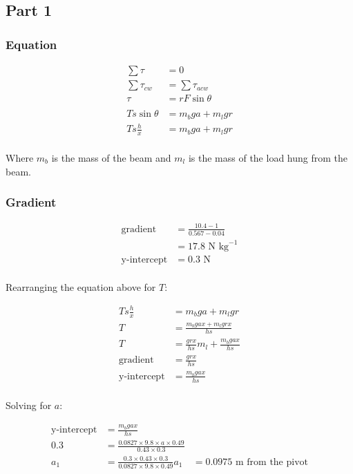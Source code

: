 \documentclass[a4paper,11pt]{article}
\begin{document}
\subsection{Part 1}

\subsubsection{Equation}

$$
\begin{aligned}
\sum \tau & = 0 \\
\sum \tau_{cw} & = \sum \tau_{acw} \\
\tau & = r F \sin{\theta} \\
\\
T s \sin{\theta} & = m_b g a + m_l g r \\
T s \frac{h}{x} & = m_b g a + m_l g r \\
\end{aligned}
$$

Where $m_b$ is the mass of the beam and $m_l$ is the mass of the load hung from the beam.


\subsubsection{Gradient}

$$
\begin{aligned}
\mbox{gradient} & = \frac{10.4 - 1}{0.567 - 0.04} \\
	& = 17.8\mbox{ N kg}^{-1} \\
\mbox{y-intercept} & = 0.3\mbox{ N} \\
\end{aligned}
$$

Rearranging the equation above for $T$:

$$
\begin{aligned}
T s \frac{h}{x} & = m_b g a + m_l g r \\
T & = \frac{m_b g a x + m_l g r x}{h s} \\
T & = \frac{g r x}{h s} m_l + \frac{m_b g a x}{h s} \\
\mbox{gradient} & = \frac{g r x}{h s} \\
\mbox{y-intercept} & = \frac{m_b g a x}{h s} \\
\end{aligned}
$$

Solving for $a$:

$$
\begin{aligned}
\mbox{y-intercept} & = \frac{m_b g a x}{h s} \\
0.3 & = \frac{0.0827 \times 9.8 \times a \times 0.49}{0.43 \times 0.3} \\
a_1 & = \frac{0.3 \times 0.43 \times 0.3}{0.0827 \times 9.8 \times 0.49}
a_1 & = 0.0975\mbox{ m from the pivot} \\
\end{aligned}
$$
\end{document}
